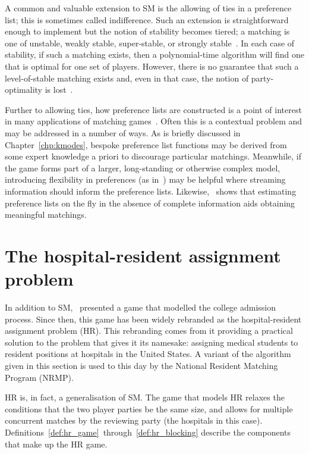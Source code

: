 A common and valuable extension to SM is the allowing of ties in a preference
list; this is sometimes called indifference. Such an extension is
straightforward enough to implement but the notion of stability becomes tiered;
a matching is one of unstable, weakly stable, super-stable, or strongly
stable~\cite{Irving1994,Iwama2016,Iwama1999}. In each case of stability, if such
a matching exists, then a polynomial-time algorithm will find one that is
optimal for one set of players. However, there is no guarantee that such a
level-of-stable matching exists and, even in that case, the notion of
party-optimality is lost~\cite{Erdil2017}.

Further to allowing ties, how preference lists are constructed is a point of
interest in many applications of matching games~\cite{Iwama2008,Manlove2002}.
Often this is a contextual problem and may be addressed in a number of ways. As
is briefly discussed in Chapter~\ref{chp:kmodes}, bespoke preference list
functions may be derived from some expert knowledge a priori to discourage
particular matchings. Meanwhile, if the game forms part of a larger,
long-standing or otherwise complex model, introducing flexibility in
preferences (as in~\cite{Agarwal2017,Menzel2015}) may be helpful where streaming
information should inform the preference lists. Likewise,~\cite{Rastegari2016}
shows that estimating preference lists on the fly in the absence of complete
information aids obtaining meaningful matchings.


\section{The hospital-resident assignment problem}

In addition to SM,~\cite{Gale1962} presented a game that modelled the college
admission process. Since then, this game has been widely rebranded as the
hospital-resident assignment problem (HR). This rebranding comes from it
providing a practical solution to the problem that gives it its namesake:
assigning medical students to resident positions at hospitals in the United
States. A variant of the algorithm given in this section is used to this day by
the National Resident Matching Program (NRMP).

HR is, in fact, a generalisation of SM. The game that models HR relaxes the
conditions that the two player parties be the same size, and allows for multiple
concurrent matches by the reviewing party (the hospitals in this case).
Definitions~\ref{def:hr_game}~through~\ref{def:hr_blocking} describe the
components that make up the HR game.

